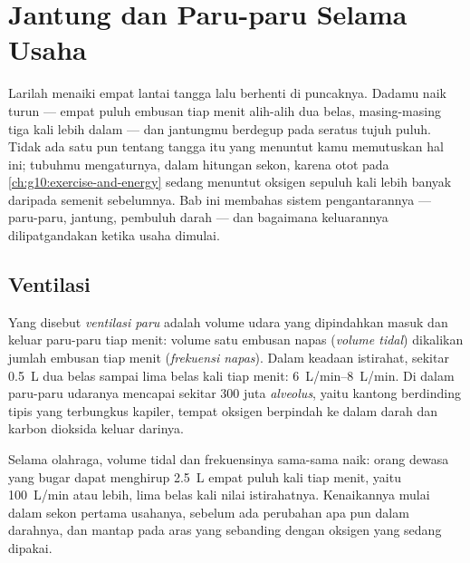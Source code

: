 \chapter{Jantung dan Paru-paru Selama Usaha}\label{ch:g10:heart-lungs-effort}

Larilah menaiki empat lantai tangga lalu berhenti di puncaknya. Dadamu
naik turun --- empat puluh embusan tiap menit alih-alih dua belas,
masing-masing tiga kali lebih dalam --- dan jantungmu berdegup pada
seratus tujuh puluh. Tidak ada satu pun tentang tangga itu yang menuntut
kamu memutuskan hal ini; tubuhmu mengaturnya, dalam hitungan sekon,
karena otot pada \cref{ch:g10:exercise-and-energy} sedang menuntut
oksigen sepuluh kali lebih banyak daripada semenit sebelumnya. Bab ini
membahas sistem pengantarannya --- paru-paru, jantung, pembuluh darah
--- dan bagaimana keluarannya dilipatgandakan ketika usaha dimulai.

\section{Ventilasi}

\begin{definition}[Ventilasi]\label{def:g10:heart-lungs-effort:ventilation}
Yang disebut \emph{ventilasi paru} adalah volume udara
yang dipindahkan masuk dan keluar paru-paru tiap menit: volume satu
embusan napas (\emph{volume tidal}) dikalikan jumlah embusan tiap menit
(\emph{frekuensi napas}). Dalam keadaan istirahat, sekitar \qty{0.5}{L}
dua belas sampai lima belas kali tiap menit: \qtyrange{6}{8}{L/min}. Di
dalam paru-paru udaranya mencapai sekitar 300 juta
\emph{alveolus}, yaitu kantong berdinding tipis yang
terbungkus kapiler, tempat oksigen berpindah ke dalam darah dan karbon
dioksida keluar darinya.
\end{definition}

\begin{proposition}\label{prop:g10:heart-lungs-effort:vent-exercise}
Selama olahraga, volume tidal dan frekuensinya sama-sama naik: orang
dewasa yang bugar dapat menghirup \qty{2.5}{L} empat puluh kali tiap
menit, yaitu \qty{100}{L/min} atau lebih, lima belas kali nilai
istirahatnya. Kenaikannya mulai dalam sekon pertama usahanya, sebelum
ada perubahan apa pun dalam darahnya, dan mantap pada aras yang
sebanding dengan oksigen yang sedang dipakai.
\end{proposition}
\admitted

